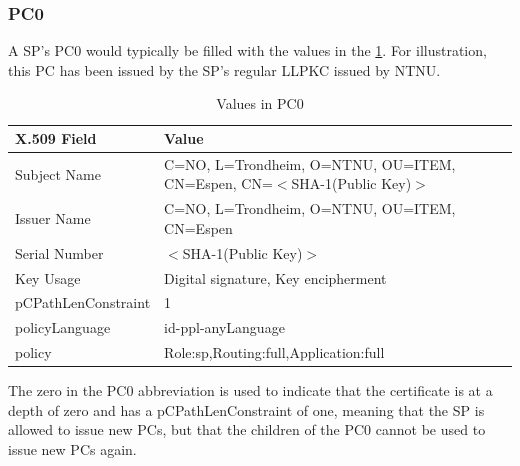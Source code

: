 \subsubsection*{\acf{PC0}}
A \acl{SP}'s \ac{PC0} would typically be filled with the values in the
\ref{tab:pc0_values}. For illustration, this \ac{PC} has been issued by the
\ac{SP}'s regular \ac{LLPKC} issued by NTNU.
\begin{table}[h]
	\begin{tabularx}{\linewidth}{ | l | X |}
		\hline
 		\textbf{X.509 Field} & \textbf{Value}\\\hline
		Subject Name & C=NO, L=Trondheim, O=NTNU, OU=ITEM, CN=Espen, CN=$<$SHA-1(Public Key)$>$ \\\hline
		Issuer Name & C=NO, L=Trondheim, O=NTNU, OU=ITEM, CN=Espen \\\hline 
		Serial Number & $<$SHA-1(Public Key)$>$ \\\hline 
		Key Usage & Digital signature, Key encipherment \\\hline 
		pCPathLenConstraint & 1 \\\hline 
		policyLanguage & id-ppl-anyLanguage \\\hline 
		policy & Role:sp,Routing:full,Application:full \\\hline 
	\end{tabularx}
	\caption{Values in \acf{PC0}}
	\label{tab:pc0_values}
\end{table}
The zero in the PC0 abbreviation is used to indicate that the certificate is at
a depth of zero and has a pCPathLenConstraint of one, meaning that the \ac{SP}
is allowed to issue new \acp{PC}, but that the children of the \ac{PC0} cannot
be used to issue new \acp{PC} again.

